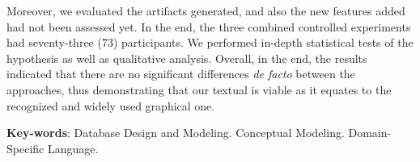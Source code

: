 \begin{resumo}[Abstract]
Moreover, we evaluated the artifacts generated, and also the new features added had not been assessed yet.
In the end, the three combined controlled experiments had seventy-three (73) participants. 
We performed in-depth statistical tests of the hypothesis as well as qualitative analysis.
Overall, in the end, the results indicated that there are no significant differences \textit{de facto} between the approaches, thus demonstrating that our textual is viable as it equates to the recognized and widely used graphical one.

\vspace{\onelineskip}

 \noindent 
 \textbf{Key-words}: Database Design and Modeling. Conceptual Modeling. Domain-Specific Language.
\end{resumo}